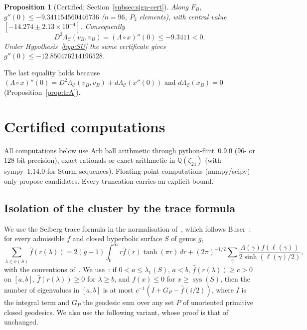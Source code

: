 \documentclass[11pt]{amsart}
\newtheorem{proposition}[theorem]{Proposition}
\theoremstyle{definition}
\theoremstyle{remark}
\newcommand{\Q}{\mathbb{Q}}
\newcommand{\Oct}{\mathcal{C}}
\newcommand{\xB}{x_B}
\newcommand{\vB}{v_B}
\newcommand{\FB}{F_B}
\begin{document}
\begin{proposition}[Certified; Section~\ref{subsec:sign-cert}]\label{prop:sign}
Along $\FB$, $g''(0)\le-9.341154560446736$ ($n=96$, $P_2$ elements), with central value
$[-14.274\pm2.13\times10^{-4}]$. Consequently
\[
D^2\Lambda_\Oct(\vB,\vB)=(\Lambda\circ x)''(0)\le-9.3411<0.
\]
Under Hypothesis~\ref{hyp:SU} the same certificate gives $g''(0)\le-12.850476214196528$.
\end{proposition}

The last equality holds because $(\Lambda\circ x)''(0)=D^2\Lambda_\Oct(\vB,\vB)+d\Lambda_\Oct(x''(0))$ and
$d\Lambda_\Oct(\xB)=0$ (Proposition~\ref{prop:trA}).

\section{Certified computations}\label{sec:cert}

All computations below use Arb ball arithmetic through python-flint~0.9.0 (96- or 128-bit
precision), exact rationals or exact arithmetic in $\Q(\zeta_{24})$ (with sympy~1.14.0 for Sturm
sequences). Floating-point computations (numpy/scipy) only propose candidates. Every
truncation carries an explicit bound.

\subsection{Isolation of the cluster by the trace formula}\label{subsec:LP}

We use the Selberg trace formula in the normalisation of~\cite[(3.1)]{FBP-K}, which follows
Buser~\cite[p.~253]{Bus10}: for every admissible $f$ and closed hyperbolic surface $S$ of genus $g$,
\[
\sum_{\lambda\in\sigma(S)}\hat f(r(\lambda))=2(g-1)\int_0^\infty r\hat f(r)\tanh(\pi r)\,dr
+(2\pi)^{-1/2}\sum_{\gamma}\frac{\Lambda(\gamma)f(\ell(\gamma))}{2\sinh(\ell(\gamma)/2)},
\]
with the conventions of~\cite{FBP-K}. We use~\cite[Lemma~3.2]{FBP-K}: if $0<a\le\lambda_1(S)$, $a<b$,
$\hat f(r(\lambda))\ge c>0$ on $[a,b]$, $\hat f(r(\lambda))\ge0$ for $\lambda\ge b$, and $f(x)\le0$ for
$x\ge\operatorname{sys}(S)$, then the number of eigenvalues in $[a,b]$ is at most $c^{-1}(I+G_P-\hat
f(i/2))$, where $I$ is the integral term and $G_P$ the geodesic sum over any set $P$ of unoriented
primitive closed geodesics. We also use the following variant, whose proof is that
of~\cite[Lemma~3.2]{FBP-K} unchanged.
\end{document}
